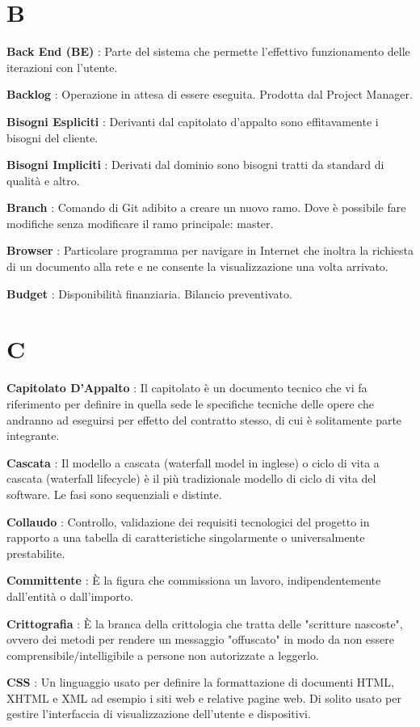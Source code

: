 \documentclass[12pt,a4paper,titlepage]{article}
\begin{document}
\section{B}
\begin{trivlist}
\item \textbf{Back End (BE)} : Parte del sistema che permette l'effettivo funzionamento delle iterazioni con l'utente.
\item \textbf{Backlog} : Operazione in attesa di essere eseguita. Prodotta dal Project Manager.
\item \textbf{Bisogni Espliciti} : Derivanti dal capitolato d'appalto sono effitavamente i bisogni del cliente.
\item \textbf{Bisogni Impliciti} : Derivati dal dominio sono bisogni tratti da standard di qualità e altro.
\item \textbf{Branch} : Comando di Git adibito a creare un nuovo ramo. Dove è possibile fare modifiche senza modificare il ramo principale: master.
\item \textbf{Browser} : Particolare programma per navigare in Internet che inoltra la richiesta di un documento alla rete e ne consente la visualizzazione una volta arrivato.
\item \textbf{Budget} : Disponibilità finanziaria. Bilancio preventivato.
\end{trivlist}

\section{C}
\begin{trivlist}
\item \textbf{Capitolato D'Appalto} : Il capitolato è un documento tecnico che vi fa riferimento per definire in quella sede le specifiche tecniche delle opere che andranno ad eseguirsi per effetto del contratto stesso, di cui è solitamente parte integrante.
\item \textbf{Cascata} : Il modello a cascata (waterfall model in inglese) o ciclo di vita a cascata (waterfall lifecycle) è il più tradizionale modello di ciclo di vita del software. Le fasi sono sequenziali e distinte.
\item \textbf{Collaudo} : Controllo, validazione dei requisiti tecnologici del progetto in rapporto a una tabella di caratteristiche singolarmente o universalmente prestabilite.
\item \textbf{Committente} : È la figura che commissiona un lavoro, indipendentemente dall'entità o dall'importo.
\item \textbf{Crittografia} : È la branca della crittologia che tratta delle "scritture nascoste", ovvero dei metodi per rendere un messaggio "offuscato" in modo da non essere comprensibile/intelligibile a persone non autorizzate a leggerlo.
\item \textbf{CSS} : Un linguaggio usato per definire la formattazione di documenti HTML, XHTML e XML ad esempio i siti web e relative pagine web. Di solito usato per gestire l'interfaccia di visualizzazione dell'utente e dispositivi.
\end{trivlist}
\end{document}
